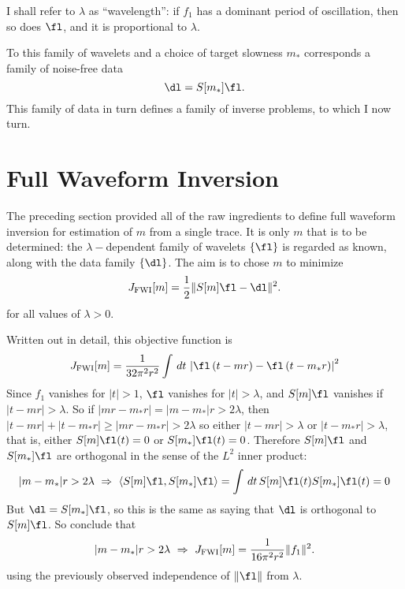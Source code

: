 I shall refer to $\lambda$ as ``wavelength'': if $f_1$ has a dominant
period of oscillation, then so does $\fl$, and it is proportional to
$\lambda$.

To this family of wavelets and a choice of target slowness $m_*$  corresponds a family of noise-free data
\begin{equation}
  \label{eqn:defdata}
  \dl=S[m_*]\fl.
\end{equation}
This family of data in turn defines a family of inverse problems, to
which I now turn.

\section{Full Waveform Inversion}
The preceding section provided all of the raw ingredients to define
full waveform inversion for estimation of $m$ from a single trace.
It is only $m$ that is to be determined: the $\lambda-$dependent family of wavelets
$\{\fl\}$ is regarded as known, along with the data family $\{\dl\}$. The aim
is to chose $m$ to minimize 
\begin{equation}
  \label{eqn:FWIfix}
  J_{\rm FWI}[m] = \frac{1}{2}\|S[m]\fl-\dl\|^2.
\end{equation}
for all values of $\lambda > 0$.

Written out in detail, this objective function is
\[
 J_{\rm FWI}[m] =  \frac{1}{32\pi^2
    r^2}\int\,dt\,\left|\fl\left(t-mr\right)-\fl\left(t-m_*r\right)\right|^2
\]
Since $f_1$ vanishes for $|t|>1$, $\fl$ vanishes for $|t|>\lambda$,
and $S[m]\fl$ vanishes if $|t-mr|>\lambda$. So if $|mr-m_*r|
= |m-m_*|r > 2\lambda$, then $|t-mr|+|t-m_*r| \ge |mr-m_*r| >
2\lambda$ so either $|t-mr|>\lambda$ or $|t-m_*r|>\lambda$, that is,
either $S[m]\fl(t)=0$ or $S[m_*]\fl(t)=0$. Therefore $S[m]\fl$ and
$S[m_*]\fl$ are orthogonal in the sense of the $L^2$ inner product:
\begin{equation}
  \label{eqn:ortho}
  |m- m_*|r > 2\lambda \,\, \Rightarrow \,\, \langle S[m]\fl,
  S[m_*]\fl\rangle = \int\,dt\,S[m]\fl(t)S[m_*]\fl(t) = 0
\end{equation}
But $\dl = S[m_*]\fl$, so this is the same as saying that $\dl$ is
orthogonal to $S[m]\fl$. So conclude that
\begin{equation}
  \label{eqn:iso}
  |m- m_*|r > 2\lambda \,\, \Rightarrow \,\, J_{\rm FWI}[m]=\frac{1}{16\pi^2
    r^2}\|f_1\|^2.
\end{equation}
using the previously observed independence of $\|\fl\|$ from
$\lambda$.

